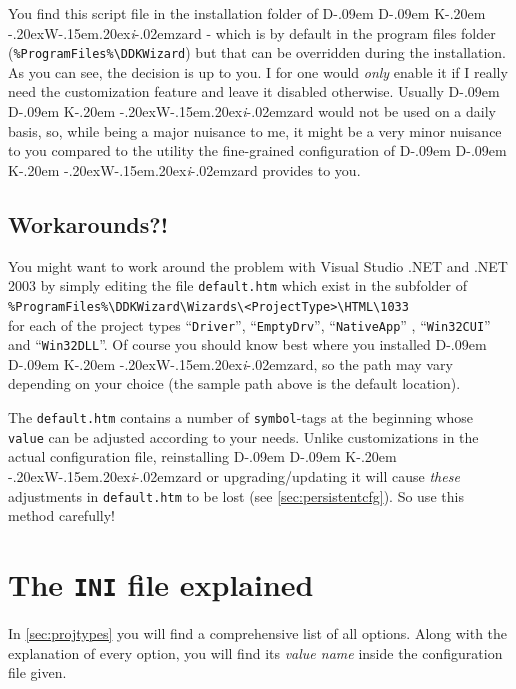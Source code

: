 \documentclass[a4paper,titlepage]{report}
\def\ddkwiz{D\kern-.09em D\kern-.09em K\kern-.20em \raise-.20ex\hbox{W}\kern-.15em\raise.20ex\hbox{\it{i}}\kern-.02em{zard}}
\begin{document}
You find this script file in the installation folder of \ddkwiz{} - which is by
default in the program files folder
(\verb+%ProgramFiles%\DDKWizard+) but that can be overridden during the installation.\\

As you can see, the decision is up to you. I for one would \emph{only} enable it if
I really need the customization feature and leave it disabled otherwise. Usually
\ddkwiz{} would not be used on a daily basis, so, while being a major nuisance
to me, it might be a very minor nuisance to you compared to the utility the
fine-grained configuration of \ddkwiz{} provides to you.

\subsection{Workarounds?!}
You might want to work around the problem with Visual Studio .NET and .NET 2003
by simply editing the file \texttt{default.htm} which exist in the subfolder of\\
\verb+%ProgramFiles%\DDKWizard\Wizards\<ProjectType>\HTML\1033+\\
for each of the
project types ``\texttt{Driver}'', ``\texttt{EmptyDrv}'', ``\texttt{NativeApp}''
, ``\texttt{Win32CUI}'' and ``\texttt{Win32DLL}''. Of course you should know best where you installed
\ddkwiz{}, so the path may vary depending on your choice (the sample path above
is the default location).

The \texttt{default.htm} contains a number of \texttt{symbol}-tags at the beginning
whose \texttt{value} can be adjusted according to your needs. Unlike customizations
in the actual configuration file, reinstalling \ddkwiz{} or
upgrading/updating it will cause \emph{these} adjustments in \texttt{default.htm}
to be lost (see \autoref{sec:persistentcfg}). So use this method carefully!

\section{The \texttt{INI} file explained}
In \autoref{sec:projtypes} you will find a comprehensive list of all options.
Along with the explanation of every option, you will find its \emph{value name} inside the
configuration file given.
\end{document}
